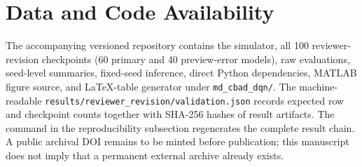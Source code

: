 \documentclass[11pt]{article}
\begin{document}
\section*{Data and Code Availability}

The accompanying versioned repository contains the simulator, all 100 reviewer-revision checkpoints (60 primary and 40 preview-error models), raw evaluations, seed-level summaries, fixed-seed inference, direct Python dependencies, MATLAB figure source, and LaTeX-table generator under \texttt{md\_cbad\_dqn/}. The machine-readable \texttt{results/reviewer\_revision/validation.json} records expected row and checkpoint counts together with SHA-256 hashes of result artifacts. The command in the reproducibility subsection regenerates the complete result chain. A public archival DOI remains to be minted before publication; this manuscript does not imply that a permanent external archive already exists.

\begingroup
\small
\setlength{\itemsep}{0.2em}


\endgroup
\end{document}
